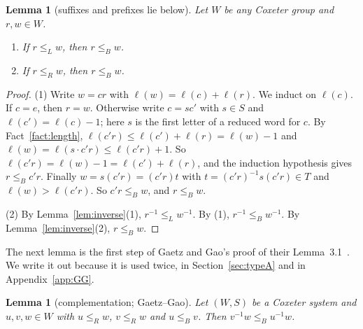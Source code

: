 \documentclass[11pt]{amsart}
\newtheorem{lemma}[theorem]{Lemma}
\theoremstyle{definition}
\theoremstyle{remark}
\numberwithin{equation}{section}
\newcommand{\leR}{\le_R}
\newcommand{\leL}{\le_L}
\newcommand{\leB}{\le_B}
\begin{document}
\begin{lemma}[suffixes and prefixes lie below]\label{lem:suffix}
Let \(W\) be any Coxeter group and \(r,w\in W\).
\begin{enumerate}
\item If \(r\leL w\), then \(r\leB w\).
\item If \(r\leR w\), then \(r\leB w\).
\end{enumerate}
\end{lemma}

\begin{proof}
(1) Write \(w=cr\) with \(\ell(w)=\ell(c)+\ell(r)\). We induct on \(\ell(c)\). If \(c=e\), then \(r=w\). Otherwise write \(c=sc'\) with \(s\in S\) and \(\ell(c')=\ell(c)-1\); here \(s\) is the first letter of a reduced word for \(c\). By Fact~\ref{fact:length}, \(\ell(c'r)\le\ell(c')+\ell(r)=\ell(w)-1\) and \(\ell(w)=\ell(s\cdot c'r)\le\ell(c'r)+1\). So \(\ell(c'r)=\ell(w)-1=\ell(c')+\ell(r)\), and the induction hypothesis gives \(r\leB c'r\). Finally \(w=s(c'r)=(c'r)t\) with \(t=(c'r)^{-1}s(c'r)\in T\) and \(\ell(w)>\ell(c'r)\). So \(c'r\leB w\), and \(r\leB w\).

(2) By Lemma~\ref{lem:inverse}(1), \(r^{-1}\leL w^{-1}\). By (1), \(r^{-1}\leB w^{-1}\). By Lemma~\ref{lem:inverse}(2), \(r\leB w\).
\end{proof}

The next lemma is the first step of Gaetz and Gao's proof of their Lemma~3.1~\cite{GG}. We write it out because it is used twice, in Section~\ref{sec:typeA} and in Appendix~\ref{app:GG}.

\begin{lemma}[complementation; Gaetz--Gao]\label{lem:compl}
Let \((W,S)\) be a Coxeter system and \(u,v,w\in W\) with \(u\leR w\), \(v\leR w\) and \(u\leB v\). Then \(v^{-1}w\leB u^{-1}w\).
\end{lemma}
\end{document}
